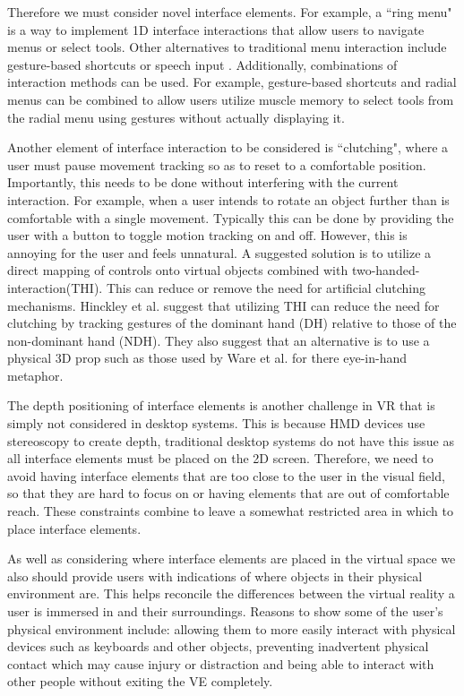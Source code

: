 \documentclass{sig-alternate-05-2015}
\begin{document}
Therefore we must consider novel interface elements. For example, a ``ring menu" is a way to implement 1D interface interactions that allow users to navigate menus or select tools\cite{Hand1997}. Other alternatives to traditional menu interaction include gesture-based shortcuts\cite{Zeleznik2007} or speech input \cite{VanDam1997,Bowman2001,Hand1997}. Additionally, combinations of interaction methods can be used. For example, gesture-based shortcuts and radial menus can be combined to allow users utilize muscle memory to select tools from the radial menu using gestures without actually displaying it.\cite{Kurtenbach1993}
 
 Another element of interface interaction to be considered is ``clutching", where a user must pause movement tracking so as to reset to a comfortable position\cite{Hand1997}. Importantly, this needs to be done without interfering with the current interaction. For example, when a user intends to rotate an object further than is comfortable with a single movement. Typically this can be done by providing the user with a button to toggle motion tracking on and off. However, this is annoying for the user and feels unnatural\cite{Hand1997}.  A suggested solution is to utilize a direct mapping of controls onto virtual objects combined with two-handed-interaction(THI). This can reduce or remove the need for artificial clutching mechanisms\cite{Hand1997}.  Hinckley et al. suggest that utilizing THI can reduce the need for clutching by tracking gestures of the dominant hand (DH) relative to those of the non-dominant hand (NDH)\cite{Hinckley1994}. They also suggest that an alternative is to use a physical 3D prop such as those used by Ware et al. for there eye-in-hand metaphor\cite{Ware1990}.
 
 The depth positioning of interface elements is another challenge in VR that is simply not considered in desktop systems.\cite{alger2015visual} This is because HMD devices use stereoscopy to create depth, traditional desktop systems do not have this issue as all interface elements must be placed on the 2D screen. Therefore, we need to avoid having interface elements that are too close to the user in the visual field, so that they are hard to focus on or having elements that are out of comfortable reach. These constraints combine to leave a somewhat restricted area in which to place interface elements.
 
As well as considering where interface elements are placed in the virtual space we also should provide users with indications of where objects in their physical environment are. This helps reconcile the differences between the virtual reality a user is immersed in and their surroundings\cite{Duval2014}. Reasons to show some of the user's physical environment include: allowing them to more easily interact with physical devices such as keyboards and other objects, preventing inadvertent physical contact which may cause injury or distraction and being able to interact with other people without exiting the VE completely.
 
\end{document}
